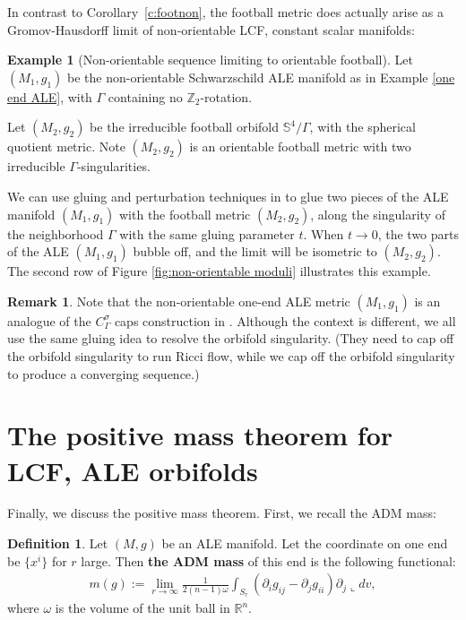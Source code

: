 \documentclass[12pt]{amsart}
\theoremstyle{definition}
\newtheorem{definition}[theorem]{Definition}
\newtheorem{remark}[theorem]{Remark}
\newtheorem{example}[theorem]{Example}
\begin{document}
In contrast to Corollary~\ref{c:footnon}, the football metric does actually arise as a Gromov-Hausdorff limit of non-orientable LCF, constant scalar manifolds:

\begin{example}[Non-orientable sequence limiting to orientable football]\label{e: non-orientable 2}
Let $(M_1,g_1)$ be the non-orientable Schwarzschild ALE manifold as in Example \ref{one end ALE}, with $\Gamma$ containing no $\mathbb{Z}_2$-rotation.

Let $(M_2, g_2)$ be the irreducible football orbifold $\mathbb{S}^4/\Gamma$, with the spherical quotient metric. Note $(M_2,g_2)$ is an orientable football metric with two irreducible $\Gamma$-singularities.

We can use gluing and perturbation techniques in \cite{joyce2003constant} to glue two pieces of the ALE manifold $(M_1,g_1)$ with the football metric $(M_2, g_2)$, along the singularity of the neighborhood $\Gamma$ with the same gluing parameter $t$. When $t\to 0$, the two parts of the ALE $(M_1, g_1)$ bubble off, and the limit will be isometric to $(M_2,g_2)$. The second row of Figure \ref{fig:non-orientable moduli} illustrates this example.
\end{example}



\begin{remark}
    Note that the non-orientable one-end ALE metric $(M_1,g_1)$ is an analogue of the $C_\Gamma^\sigma$ caps construction in \cite{ChenZhu}. Although the context is different, we all use the same gluing idea to resolve the orbifold singularity. (They need to cap off the orbifold singularity to run Ricci flow, while we cap off the orbifold singularity to produce a converging sequence.)
\end{remark}

\section{The positive mass theorem for LCF, ALE orbifolds}\label{PMT proof}

Finally, we discuss the positive mass theorem. First, we recall the ADM mass:

\begin{definition}\label{mass}
    Let $(M,g)$ be an ALE manifold. Let the coordinate on one end be $\{x^i\}$ for $r$ large. Then \textbf{the ADM mass} of this end is the following functional:
    \begin{align*}
            m(g):=\lim\limits_{r\to\infty}\frac{1}{2(n-1)\omega}\int_{S_r}(\partial_i g_{ij}-\partial_j g_{ii})\partial_j\llcorner dv,
    \end{align*}
    where $\omega$ is the volume of the unit ball in $\mathbb{R}^n$.
\end{definition}
\end{document}
